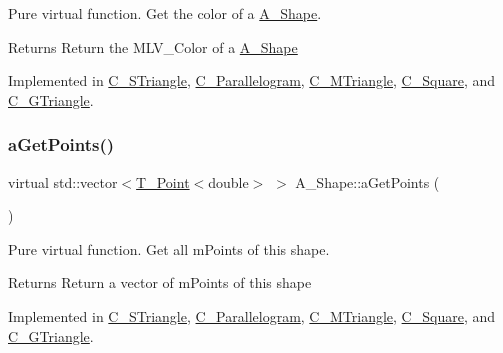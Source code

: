 Pure virtual function. Get the color of a \hyperlink{classA__Shape}{A\+\_\+\+Shape}. 

\begin{DoxyReturn}{Returns}
Return the M\+L\+V\+\_\+\+Color of a \hyperlink{classA__Shape}{A\+\_\+\+Shape} 
\end{DoxyReturn}


Implemented in \hyperlink{classC__STriangle_a1a0c315653ece65118705648d09336dd}{C\+\_\+\+S\+Triangle}, \hyperlink{classC__Parallelogram_afd5055e948fcd992be3cdd227c8b4bfb}{C\+\_\+\+Parallelogram}, \hyperlink{classC__MTriangle_aa567d77ce0e6d664beb6eea9268b1bc3}{C\+\_\+\+M\+Triangle}, \hyperlink{classC__Square_a44b1e58b20cc98edc774a73742fec9a7}{C\+\_\+\+Square}, and \hyperlink{classC__GTriangle_a19100d603f9239fd66f1115c4358f0fc}{C\+\_\+\+G\+Triangle}.

\mbox{\label{classA__Shape_a9fd1285bd63b1fc88943c9969bf01a5c}} 
\subsubsection{\texorpdfstring{a\+Get\+Points()}{aGetPoints()}}
{\footnotesize\ttfamily virtual std\+::vector$<$\hyperlink{classT__Point}{T\+\_\+\+Point}$<$double$>$ $>$ A\+\_\+\+Shape\+::a\+Get\+Points (\begin{DoxyParamCaption}{ }\end{DoxyParamCaption})\hspace{0.3cm}{\ttfamily [pure virtual]}}



Pure virtual function. Get all m\+Points of this shape. 

\begin{DoxyReturn}{Returns}
Return a vector of m\+Points of this shape 
\end{DoxyReturn}


Implemented in \hyperlink{classC__STriangle_a8d144f4451fe2e5bf6f333d8c37f0f57}{C\+\_\+\+S\+Triangle}, \hyperlink{classC__Parallelogram_ae75f316315134020e8423feff917828e}{C\+\_\+\+Parallelogram}, \hyperlink{classC__MTriangle_ada409f8f1015cf7bf9f9ab8fb11da94b}{C\+\_\+\+M\+Triangle}, \hyperlink{classC__Square_aca738fec39149ed697f3d2413cd7cec2}{C\+\_\+\+Square}, and \hyperlink{classC__GTriangle_af3c514a6f5516c297374004a94788877}{C\+\_\+\+G\+Triangle}.

\mbox{\label{classA__Shape_a1b202256a4e5dcb0edab4ab93a37122c}} 
